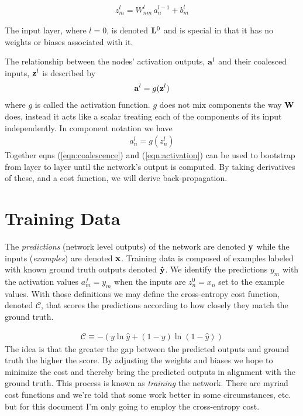 \documentclass[twocolumn]{revtex4-1}
\newcommand{\bld}[1]{\vectorbold{#1}}
\begin{document}
\begin{align}
    \label{eqn:componentCoalescence}
    z^l_m = W^l_{n m} \, a^{l - 1}_n + b^{l}_m
\end{align}

The input layer, where $l = 0$, is denoted $\bld{L}^0$ and is special in that it has no weights or biases associated with it.

The relationship between the nodes' activation outputs, $\bld{a}^l$ and their coalesced inputs, $\bld{z}^l$ is described by
\begin{align}
    \label{eqn:activation}
    \bld{a}^l = g(\bld{z}^l)
\end{align}
where $g$ is called the activation function. $g$ does not mix components the way $\bld{W}$ does, instead it acts like a scalar treating each of the components of its input independently. In component notation we have
\begin{align}
    a^l_n = g(z^l_n)
\end{align}
Together eqns (\ref{eqn:coalescence}) and (\ref{eqn:activation}) can be used to bootstrap from layer to layer until the network's output is computed. By taking derivatives of these, and a cost function, we will derive back-propagation.

\section{Training Data}
The \textit{predictions} (network level outputs) of the network are denoted $\bld{y}$ while the inputs (\textit{examples}) are denoted $\bld{x}$. Training data is composed of examples labeled with known ground truth outputs denoted $\bld{\hat{y}}$. We identify the predictions $y_m$ with the activation values $a^f_m = y_m$ when the inputs are $z^0_n = x_n$ set to the example values. With those definitions we may define the cross-entropy cost function, denoted $\mathscr{C}$, that scores the predictions according to how closely they match the ground truth.

\begin{align}
    \label{eqn:costDefn}
    \mathscr{C} \equiv - \left(y \ln \hat{y} + (1 - y) \ln (1 - \hat{y}) \right)
\end{align}
The idea is that the greater the gap between the predicted outputs and ground truth the higher the score. By adjusting the weights and biases we hope to minimize the cost and thereby bring the predicted outputs in alignment with the ground truth. This process is known as \textit{training} the network. There are myriad cost functions and we're told that some work better in some circumstances, etc. but for this document I'm only going to employ the cross-entropy cost.
\end{document}
